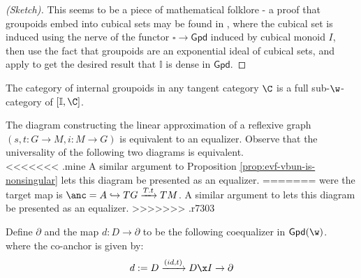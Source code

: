 \begin{proof}[(Sketch)]
	This seems to be a piece of mathematical folklore - a proof that groupoids embed into cubical sets may be found in \cite{nlab:fundamental_groupoid_of_a_cubical_set_and_the_cubical_nerve_of_a_groupoid}, where the cubical set is induced using the nerve of the functor $\square \to \mathsf{Gpd}$ induced by cubical monoid $I$, then use the fact that groupoids are an exponential ideal of cubical sets, and apply  to get the desired result that $\mathbb{I}$ is dense in $\mathsf{Gpd}$.
\end{proof}
\begin{corollary}
	The category of internal groupoids in any tangent category $\C$ is a full sub-$\w$-category of $[\mathbb{I}, \C]$.
\end{corollary}

The diagram constructing the linear approximation of a reflexive graph $(s,t:G \to M, i:M \to G)$ is equivalent to an equalizer. Observe that the universality of the following two diagrams is equivalent.
\[\]
<<<<<<< .mine
A similar argument to Proposition \ref{prop:evf-vbun-is-nonsingular} lets this diagram be presented as an equalizer.
=======
were the target map is $\anc = A \hookrightarrow TG \xrightarrow[]{T.t} TM$.
A similar argument to  lets this diagram be presented as an equalizer.
>>>>>>> .r7303
\[\]
\begin{definition}%
	\label{def:partial-gpd}
	Define $\partial$ and the map $d:D \to \partial$ to be the following coequalizer in $\mathsf{Gpd}(\w)$.
	\[\]
	where the co-anchor is given by:
	\[
		d := D \xrightarrow[]{(id, t)} D\x I \to \partial
	\]	
\end{definition}

